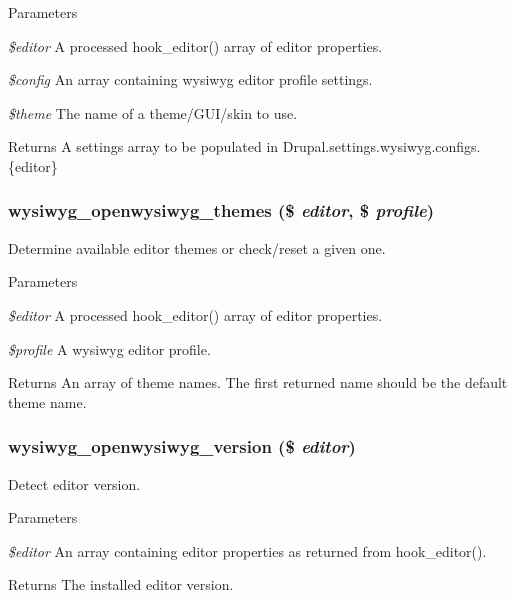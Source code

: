 \begin{DoxyParams}{Parameters}
\item[{\em \$editor}]A processed hook\_\-editor() array of editor properties. \item[{\em \$config}]An array containing wysiwyg editor profile settings. \item[{\em \$theme}]The name of a theme/GUI/skin to use.\end{DoxyParams}
\begin{DoxyReturn}{Returns}
A settings array to be populated in Drupal.settings.wysiwyg.configs.\{editor\} 
\end{DoxyReturn}
\hypertarget{openwysiwyg_8inc_a85aa49716b4d822b58a03fa426890b03}{
\subsubsection[{wysiwyg\_\-openwysiwyg\_\-themes}]{\setlength{\rightskip}{0pt plus 5cm}wysiwyg\_\-openwysiwyg\_\-themes (\$ {\em editor}, \/  \$ {\em profile})}}
\label{openwysiwyg_8inc_a85aa49716b4d822b58a03fa426890b03}
Determine available editor themes or check/reset a given one.


\begin{DoxyParams}{Parameters}
\item[{\em \$editor}]A processed hook\_\-editor() array of editor properties. \item[{\em \$profile}]A wysiwyg editor profile.\end{DoxyParams}
\begin{DoxyReturn}{Returns}
An array of theme names. The first returned name should be the default theme name. 
\end{DoxyReturn}
\hypertarget{openwysiwyg_8inc_a6beb3b3973b4624fb804889787c943b4}{
\subsubsection[{wysiwyg\_\-openwysiwyg\_\-version}]{\setlength{\rightskip}{0pt plus 5cm}wysiwyg\_\-openwysiwyg\_\-version (\$ {\em editor})}}
\label{openwysiwyg_8inc_a6beb3b3973b4624fb804889787c943b4}
Detect editor version.


\begin{DoxyParams}{Parameters}
\item[{\em \$editor}]An array containing editor properties as returned from hook\_\-editor().\end{DoxyParams}
\begin{DoxyReturn}{Returns}
The installed editor version. 
\end{DoxyReturn}
